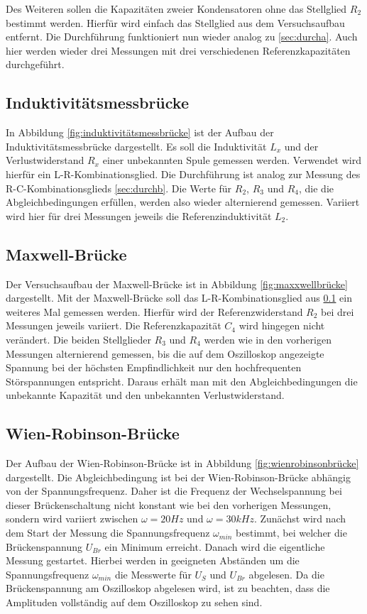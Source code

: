 Des Weiteren sollen die Kapazitäten zweier Kondensatoren ohne das Stellglied $R_2$ bestimmt werden.
Hierfür wird einfach das Stellglied aus dem Versuchsaufbau entfernt.
Die Durchführung funktioniert nun wieder analog zu \ref{sec:durcha}.
Auch hier werden wieder drei Messungen mit drei verschiedenen Referenzkapazitäten durchgeführt.

\subsection{Induktivitätsmessbrücke}
\label{sec:durchc}

In Abbildung \ref{fig:induktivitätsmessbrücke} ist der Aufbau der Induktivitätsmessbrücke dargestellt.
Es soll die Induktivität $L_x$ und der Verlustwiderstand $R_x$ einer unbekannten Spule gemessen werden.
Verwendet wird hierfür ein L-R-Kombinationsglied.
Die Durchführung ist analog zur Messung des R-C-Kombinationsglieds \ref{sec:durchb}.
Die Werte für $R_2$, $R_3$ und $R_4$, die die Abgleichbedingungen erfüllen, werden also wieder alternierend gemessen.
Variiert wird hier für drei Messungen jeweils die Referenzinduktivität $L_2$.

\subsection{Maxwell-Brücke}

Der Versuchsaufbau der Maxwell-Brücke ist in Abbildung \ref{fig:maxxwellbrücke} dargestellt.
Mit der Maxwell-Brücke soll das L-R-Kombinationsglied aus \ref{sec:durchc} ein weiteres Mal gemessen werden.
Hierfür wird der Referenzwiderstand $R_2$ bei drei Messungen jeweils variiert.
Die Referenzkapazität $C_4$ wird hingegen nicht verändert.
Die beiden Stellglieder $R_3$ und $R_4$ werden wie in den vorherigen Messungen alternierend gemessen, bis die auf dem Oszilloskop angezeigte Spannung bei der höchsten Empfindlichkeit nur den hochfrequenten Störspannungen entspricht.
Daraus erhält man mit den Abgleichbedingungen die unbekannte Kapazität und den unbekannten Verlustwiderstand.

\subsection{Wien-Robinson-Brücke}
Der Aufbau der Wien-Robinson-Brücke ist in Abbildung \ref{fig:wienrobinsonbrücke} dargestellt.
Die Abgleichbedingung ist bei der Wien-Robinson-Brücke abhängig von der Spannungsfrequenz.
Daher ist die Frequenz der Wechselspannung bei dieser Brückenschaltung nicht konstant wie 
bei den vorherigen Messungen, sondern wird variiert zwischen $\omega = 20 Hz$ und $\omega = 30kHz$.
Zunächst wird nach dem Start der Messung die Spannungsfrequenz $\omega_{min}$ bestimmt, bei welcher die Brückenspannung $U_{Br}$ ein Minimum erreicht.
Danach wird die eigentliche Messung gestartet.
Hierbei werden in geeigneten Abständen um die Spannungsfrequenz $\omega_{min}$ die Messwerte für $U_S$ und $U_{Br}$ abgelesen.
Da die Brückenspannung am Oszilloskop abgelesen wird, ist zu beachten, dass die Amplituden vollständig auf dem Oszilloskop zu sehen sind.
\newpage
